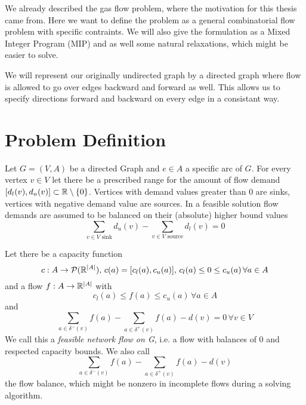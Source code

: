 We already described the gas flow problem, where the motivation for this thesis came from. Here we want to define the 
problem as a general combinatorial flow problem with specific contraints. We will also give the formulation as a Mixed 
Integer Program (MIP) and as well some natural relaxations, which might be easier to solve.

We will represent our originally undirected graph by a directed graph where flow is allowed to go over edges backward 
and forward as well. This allows us to specify directions forward and backward on every edge in a consistant way. 
\section{Problem Definition}

\begin{definition}
 Let $G=(V,A)$ be a directed Graph and $e \in A$ a specific arc of $G$. For every vertex $v\in V$ let there be a 
prescribed range for the amount of flow demand $[d_l(v), d_u(v)]\subset \mathbb{R} \setminus \{0\}$. Vertices with demand 
values greater than 0 are sinks, vertices with negative demand value are sources. In a feasible solution flow 
demands are assumed to be balanced on their (absolute) higher bound values 
$$\sum_{v \in V\textrm{ sink}}d_u(v)-\sum_{v \in V\textrm{ source}}d_l(v)=0$$ 

Let there be a capacity function 
$$c:A\to \mathcal{P}(\mathbb{R}^{|A|}), \, c(a)=[c_l(a), c_u(a)],\, c_l(a)\le 0 \le c_u(a) \, \forall a\in A$$
and a flow  $f: A\to\mathbb{R}^{|A|} $ with $$c_l(a)\le f(a)\le 
c_u(a)\, \forall a\in A$$ and $$\sum_{a\in\delta^-(v)}f(a)-\sum_{a\in\delta^+(v)}f(a)-d(v) = 0 \, \forall v\in V$$
We call this a \textit{feasible network flow on G}, i.e. a flow with balances of 0 and respected capacity bounds.
We also call $$\sum_{a\in \delta^-(v)}f(a)-\sum_{a\in\delta^+(v)}f(a)-d(v)$$ the flow balance, which might be nonzero 
in incomplete flows during a solving algorithm.\\
\end{definition}

